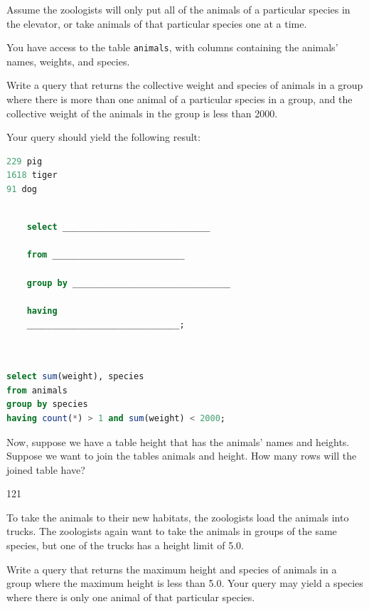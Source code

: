 \documentclass{exam}
\begin{document}
\begin{questions}
Assume the zoologists will only put all of the animals of a particular species in the elevator, or take animals of that particular species one at a time.

You have access to the table \texttt{animals}, with columns containing the animals’ names, weights, and species.

Write a query that returns the collective weight and species of animals in a group where there is more than one animal of a particular species in a group, and the collective weight of the animals in the group is less than 2000.

Your query should yield the following result:

\begin{lstlisting}[language=SQL]
229 pig
1618 tiger
91 dog
\end{lstlisting}

\begin{lstlisting}[language=SQL]

    select _____________________________ 

    from __________________________

    group by _______________________________

    having 
    ______________________________;
    
\end{lstlisting}
\begin{solution}
\begin{lstlisting}[language=SQL]
 
select sum(weight), species
from animals
group by species
having count(*) > 1 and sum(weight) < 2000;
\end{lstlisting}
\end{solution}

\item Now, suppose we have a table height that has the animals' names and heights.  Suppose we want to join the tables animals and height.  How many rows will the joined table have?
\begin{solution}[2cm] 121 \end{solution}

\clearpage

\item To take the animals to their new habitats, the zoologists load the animals into trucks.  The zoologists again want to take the animals in groups of the same species, but one of the trucks has a height limit of 5.0.
 
Write a query that returns the maximum height and species of animals in a group where the maximum height is less than 5.0.  Your query may yield a species where there is only one animal of that particular species.


\end{questions}
\end{document}
